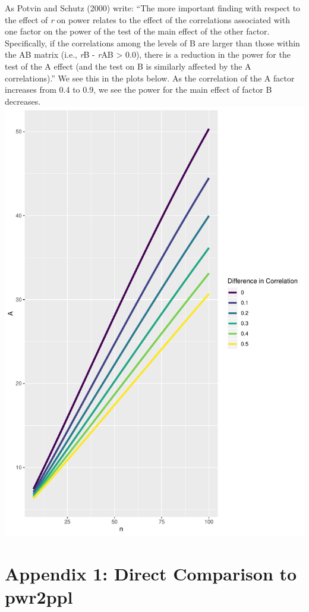\documentclass[]{book}
\begin{document}
As Potvin and Schutz (2000) write: ``The more important finding with respect to the effect of \emph{r} on power relates to the effect of the correlations associated with one factor on the power of the test of the main effect of the other factor. Specifically, if the correlations among the levels of B are larger than those within the AB matrix (i.e., \emph{r}B - \emph{r}AB \textgreater{} 0.0), there is a reduction in the power for the test of the A effect (and the test on B is similarly affected by the A correlations).''
We see this in the plots below. As the correlation of the A factor increases from 0.4 to 0.9, we see the power for the main effect of factor B decreases.
\includegraphics{SuperpowerValidation_files/figure-latex/unnamed-chunk-220-1.pdf}

\hypertarget{appendix-1-direct-comparison-to-pwr2ppl}{%
\chapter{Appendix 1: Direct Comparison to pwr2ppl}\label{appendix-1-direct-comparison-to-pwr2ppl}}
\end{document}
